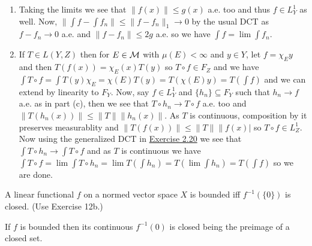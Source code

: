 \documentclass[12pt,a4paper]{article}
\begin{document}
\begin{solution}
\begin{enumerate}[label=\alph*.]
    Now, say $f,g\in L_Y^1$ and $f_n\to f,g_n\to g$ through $F_Y$, in $\|\cdot\|_1$ then we clearly see that $f_n+g_n\to f+g$ through $F_Y$, in $\|\cdot\|_1$ and thus, 
    \[
        \int f+g=\lim\int f_n+g_n=\lim \qty(\int f_n+\int g_n)=\lim\int f_n+\lim\int g_n=\int f+\int g
    \]
    and it can be trivially shown that $\int\alpha f=\alpha\int f$ for $\alpha\in\bK$ so this linear. 
    We also see that if $h_n\to f$ similarly then by continuity of the norm(s), 
    \[
        \left\|\int f\right\|= \left\|\lim_{n\to\infty}\int h_n\right\|= \lim_{n\to\infty} \left\|\int h_n\right\|\leq\lim_{n\to\infty}\|h_n\|_1= \left\|\lim_{n\to\infty}h_n\right\|_1=\|f\|_1
    \]
    Now if $\int^*$ is another linear map as such, then these must agree on $F_Y$ and if $h_n\to f\in L_Y^1$ as above, then 
    \[
        \left\|\int^*f-\int h_n\right\|= \left\|\int^*f-\int^*h_n\right\|= \left\|\int^*(f-h_n)\right\|\leq\|f-h_n\|_1\to 0
    \]
    and thus $\int f=\lim\int h_n=\int^* f$ implying $\int=\int^*$ proving uniqueness. 
\item Taking the limits we see that $\|f(x)\|\leq g(x)$ a.e. too and thus $f\in L_Y^1$ as well. 
    Now, $\|\int f-\int f_n\|\leq\|f-f_n\|_1\to 0$ by the usual DCT as $f-f_n\to 0$ a.e. and $\|f-f_n\|\leq 2g$ a.e. so we have $\int f=\lim\int f_n.$ 
\item If $T\in L(Y,Z)$ then for $E\in\mathcal{M}$ with $\mu(E)<\infty$ and $y\in Y$, let $f=\chi_Ey$ and then $T(f(x))=\chi_E(x)T(y)$ so $T\circ f\in F_Z$ and we have $\int T\circ f=\int T(y)\chi_E=\chi(E)T(y)=T(\chi(E)y)=T(\int f)$ and we can extend by linearity to $F_Y$. 
    Now, say $f\in L^1_Y$ and $\{h_n\} \subseteq F_Y$ such that $h_n\to f$ a.e. as in part (c), then we see that $T\circ h_n\to T\circ f$ a.e. too and $\|T(h_n(x))\|\leq\|T\|\|h_n(x)\|$. 
    As $T$ is continuous, composition by it preserves measurablity and $\|T(f(x))\|\leq\|T\|\|f(x)|$ so $T\circ f\in L_Z^1$. 
    Now using the generalized DCT in \hyperref[prob:2-20]{Exercise 2.20} we see that $\int T\circ h_n\to\int T\circ f$ and as $T$ is continuous we have $\int T\circ f=\lim\int T\circ h_n=\lim T (\int h_n)=T (\lim\int h_n)=T(\int f)$ so we are done. 
\end{enumerate}
\end{solution}
\begin{problem}\label{prob:5-17}
A linear functional $f$ on a normed vector space $X$ is bounded iff $f^{-1}(\{0\})$ is closed. (Use Exercise 12b.)
\end{problem}
If $f$ is bounded then its continuous $f^{-1}( \qty{0})$ is closed being the preimage of a closed set. 
\end{document}
